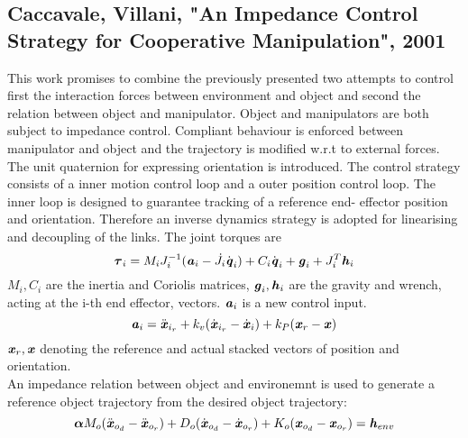 \documentclass[conference]{IEEEtran}
\begin{document}

\subsection{Caccavale, Villani, "An Impedance Control Strategy for Cooperative Manipulation", 2001} \label{CaccavaleVillani2001:num1}
This work promises to  combine the previously presented  two attempts to control first the interaction forces between environment and object and second the relation between object and manipulator. Object and manipulators are both subject to impedance control. Compliant behaviour is enforced between manipulator and object and the trajectory is modified w.r.t to external forces. The unit quaternion for expressing orientation is introduced. The control strategy consists of a inner motion control loop and a outer position control loop. The inner loop is designed to guarantee tracking of a reference end- effector position and orientation. Therefore an inverse dynamics strategy is adopted for linearising and decoupling of the links. The joint torques are
\begin{equation}
\boldsymbol{\tau}_i = M_i  J_i^{-1} ( \textbf{\textit{a}}_i - \dot{J}_i\dot{\textbf{\textit{q}}}_i) + C_i\dot{\textbf{\textit{q}}}_i + \textbf{\textit{g}}_i +  J_i^T\textbf{\textit{h}}_i
\end{equation}
$ M_i,C_i $ are the inertia and Coriolis matrices, $ \textbf{\textit{g}}_i,\textbf{\textit{h}}_i $ are the gravity and wrench, acting at the i-th end effector, vectors.
$ \textbf{\textit{a}}_i $ is a new control input.
\begin{equation}
\textbf{\textit{a}}_i = \ddot{\textbf{\textit{x}}}_{i_r} + k_v(\dot{\textbf{\textit{x}}}_{i_r} - \dot{\textbf{\textit{x}}}_{i}) + k_P(\textbf{\textit{x}}_r - \textbf{\textit{x}})
\end{equation}
$ \textbf{\textit{x}}_r,\textbf{\textit{x}} $ denoting the reference and actual stacked vectors of position and orientation. \\
An impedance relation between object and environemnt is used to generate a reference object trajectory from the desired object trajectory:
\begin{equation}
\boldsymbol{\alpha}M_o(\ddot{\textbf{\textit{x}}}_{o_d} - \ddot{\textbf{\textit{x}}}_{o_r})  + D_o(\dot{\textbf{\textit{x}}}_{o_d} - \dot{\textbf{\textit{x}}}_{o_r}) + K_o(\textbf{\textit{x}}_{o_d} - \textbf{\textit{x}}_{o_r})  = \textbf{\textit{h}}_{env}
\end{equation}
\end{document}
